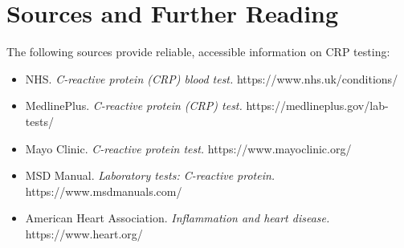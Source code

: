 \section*{Sources and Further Reading}
The following sources provide reliable, accessible information on CRP testing:
\begin{itemize}
    \item NHS. \textit{C-reactive protein (CRP) blood test.} https://www.nhs.uk/conditions/
    \item MedlinePlus. \textit{C-reactive protein (CRP) test.} https://medlineplus.gov/lab-tests/
    \item Mayo Clinic. \textit{C-reactive protein test.} https://www.mayoclinic.org/
    \item MSD Manual. \textit{Laboratory tests: C-reactive protein.} https://www.msdmanuals.com/
    \item American Heart Association. \textit{Inflammation and heart disease.} https://www.heart.org/
\end{itemize}
